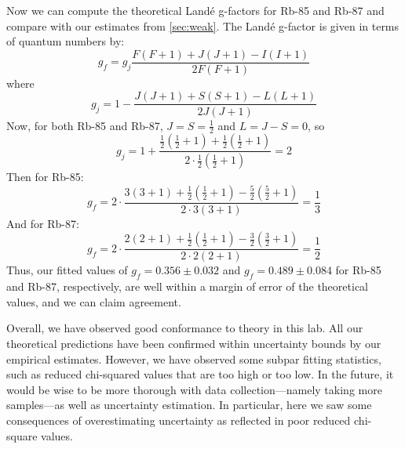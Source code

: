 \documentclass[12pt, letterpaper]{article}
\begin{document}
Now we can compute the theoretical Landé g-factors for Rb-85 and Rb-87 and compare with our estimates from \ref{sec:weak}. The Landé g-factor is given in terms of quantum numbers by:
\begin{equation}
    g_f = g_j \frac{F(F+1) + J(J+1) - I(I+1)}{2F(F+1)}
\end{equation}
where
\begin{equation}
    g_j = 1 - \frac{J(J+1) + S(S+1) - L(L+1)}{2J(J+1)}
\end{equation}
Now, for both Rb-85 and Rb-87, $J=S=\frac{1}{2}$ and $L=J-S=0$, so
\begin{equation}
    g_j = 1 + \frac{\frac{1}{2}(\frac{1}{2}+1) + \frac{1}{2}(\frac{1}{2}+1)}{2 \cdot \frac{1}{2}(\frac{1}{2}+1)} = 2
\end{equation}
Then for Rb-85:
\begin{equation}
    g_f = 2 \cdot \frac{3(3+1) + \frac{1}{2}(\frac{1}{2}+1) - \frac{5}{2}(\frac{5}{2}+1)}{2 \cdot 3(3+1)} = \frac{1}{3}
\end{equation}
And for Rb-87:
\begin{equation}
    g_f = 2 \cdot \frac{2(2+1) + \frac{1}{2}(\frac{1}{2}+1) - \frac{3}{2}(\frac{3}{2}+1)}{2 \cdot 2(2+1)} = \frac{1}{2}
\end{equation}
Thus, our fitted values of $g_f = 0.356 \pm 0.032$ and $g_f = 0.489 \pm 0.084$ for Rb-85 and Rb-87, respectively, are well within a margin of error of the theoretical values, and we can claim agreement. 

Overall, we have observed good conformance to theory in this lab. All our theoretical predictions have been confirmed within uncertainty bounds by our empirical estimates. However, we have observed some subpar fitting statistics, such as reduced chi-squared values that are too high or too low. In the future, it would be wise to be more thorough with data collection—namely taking more samples—as well as uncertainty estimation. In particular, here we saw some consequences of overestimating uncertainty as reflected in poor reduced chi-square values. 
\end{document}
